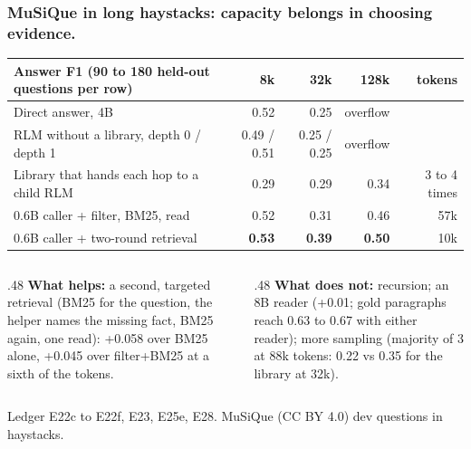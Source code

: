 \documentclass[aspectratio=169,11pt]{beamer}
\newcommand{\source}[1]{\vfill{\scriptsize\color{Gray}#1\par}}
\begin{document}
\begin{frame}[t]
\frametitle{MuSiQue in long haystacks: capacity belongs in choosing evidence.}
\centering\footnotesize
\begin{tabular}{@{}lrrrr@{}}
\toprule
Answer F1 (90 to 180 held-out questions per row) & 8k & 32k & 128k & tokens \\
\midrule
Direct answer, 4B & 0.52 & 0.25 & overflow & \\
RLM without a library, depth 0 / depth 1 & 0.49 / 0.51 & 0.25 / 0.25 & overflow & \\
Library that hands each hop to a child RLM & 0.29 & 0.29 & 0.34 & 3 to 4 times \\
0.6B caller + filter, BM25, read & 0.52 & 0.31 & 0.46 & 57k \\
0.6B caller + two-round retrieval & \textbf{0.53} & \textbf{0.39} & \textbf{0.50} & 10k \\
\bottomrule
\end{tabular}
\par\medskip\raggedright
\begin{columns}[T,onlytextwidth]
\begin{column}{.48\textwidth}
\small \textbf{What helps:} a second, targeted retrieval (BM25 for the question, the helper names the missing
fact, BM25 again, one read): +0.058 over BM25 alone, +0.045 over filter+BM25 at a sixth of the tokens.
\end{column}
\begin{column}{.48\textwidth}
\small \textbf{What does not:} recursion; an 8B reader (+0.01; gold paragraphs reach 0.63 to 0.67 with either
reader); more sampling (majority of 3 at 88k tokens: 0.22 vs 0.35 for the library at 32k).
\end{column}
\end{columns}
\source{Ledger E22c to E22f, E23, E25e, E28. MuSiQue (CC BY 4.0) dev questions in haystacks.}
\end{frame}
\end{document}
